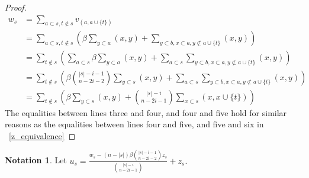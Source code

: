 \documentclass[10 pt]{amsart}
\theoremstyle{plain}
\theoremstyle{definition}
\newtheorem{note}[thm]{Notation}
\theoremstyle{remark}
\numberwithin{equation}{section}
\begin{document}
\begin{proof}
\begin{align*}
	w_s &= \sum_{a \subset s,t\notin s}^{}v_{(a, a \cup \{t\})}\\
	&= \sum_{a \subset s,t\notin s}^{}\left(\beta \sum_{y \subset a}^{}(x, y) + \sum_{y\subset b,x \subset a,y\not\subset a \cup \{t\}}^{}(x, y) \right)\\
	&= \sum_{t\notin s}^{}\left(\sum_{a \subset s}^{}\beta \sum_{y \subset a}^{}(x, y) + \sum_{a \subset s}^{}\sum_{y\subset b,x \subset a,y\not\subset a \cup \{t\}}^{}(x, y) \right)\\
	&=\sum_{t\notin s}^{}\left(\beta \binom {|s|-i-1}{n-2i-2}\sum_{y \subset s}^{}(x, y) + \sum_{a \subset s}^{}\sum_{y\subset b,x \subset a,y\not\subset a \cup \{t\}}^{}(x, y) \right)\\
	&=\sum_{t\notin s}^{} \left(\beta \sum_{y \subset s}^{}(x, y) + \binom {|s|-i}{n-2i-1}\sum_{x \subset s}^{}(x, x \cup \{t\}) \right)
\end{align*}
The equalities between lines three and four, and four and five hold for similar reasons as the equalities between lines four and five, and five and six in ~\ref{z_equivalence}
\end{proof}

\begin{note}
Let $u_s = \frac{w_s - (n - |s|)\beta \binom {|s|-i-1}{n-2i-2} z_s}{\binom {|s|-i}{n-2i-1}} + z_s.$
\end{note}
\end{document}
